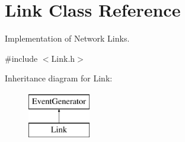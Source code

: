 \hypertarget{classLink}{\section{\-Link \-Class \-Reference}
\label{classLink}
}


\-Implementation of \-Network \-Links.  




{\ttfamily \#include $<$\-Link.\-h$>$}

\-Inheritance diagram for \-Link\-:\begin{figure}[H]
\begin{center}
\leavevmode
\includegraphics[height=2.000000cm]{classLink}
\end{center}
\end{figure}
